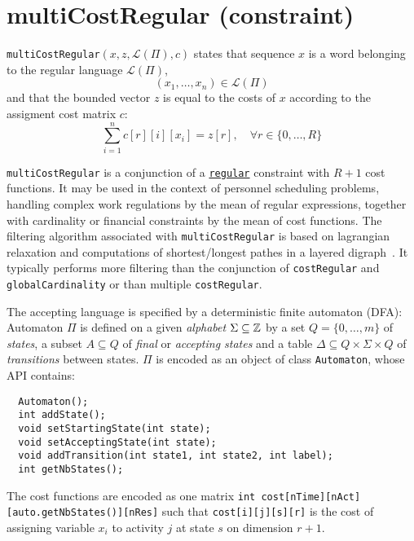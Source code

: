\label{multicostregular}
\hypertarget{multicostregular}{}

\section{multiCostRegular (constraint)}\label{multicostregular:multicostregularconstraint}\hypertarget{multicostregular:multicostregularconstraint}{}
\begin{notedef}
  \texttt{multiCostRegular}$(x,z,\mathcal{L}(\Pi),c)$ states that sequence $x$ is a word belonging to the regular language $\mathcal{L}(\Pi)$,
$$(x_1,\ldots,x_n)\in\mathcal{L}(\Pi)$$
and that the bounded vector $z$ is equal to the costs of $x$ according to the assigment cost matrix $c$:
$$\sum_{i=1}^{n} c[r][i][x_i]=z[r],\quad \forall r\in\{0,\ldots,R\}$$
\end{notedef}
\texttt{multiCostRegular} is a conjunction of a \hyperlink{regular}{\texttt{regular}} constraint with $R+1$ cost functions.
It may be used in the context of personnel scheduling problems, handling complex work regulations by the mean of regular expressions, together with cardinality or financial constraints by the mean of cost functions.
The filtering algorithm associated with \texttt{multiCostRegular} is based on lagrangian relaxation and computations of shortest/longest pathes in a layered digraph~\cite{MenanaCPAIOR09}. It typically performs more filtering than the conjunction of \texttt{costRegular} and \texttt{globalCardinality} or than multiple \texttt{costRegular}.

The accepting language is specified by a deterministic finite automaton (DFA):
Automaton $\Pi$ is defined on a given \emph{alphabet} $\Sigma\subseteq\mathbb{Z}$ by a set $Q=\{0,\ldots,m\}$ of \emph{states}, a subset $A\subseteq Q$ of \emph{final} or \emph{accepting states} and a table $\Delta\subseteq Q\!\times\!\Sigma\!\times Q$ of \emph{transitions} between states. $\Pi$ is encoded as an object of class \texttt{Automaton}, whose API contains:
\begin{lstlisting}
  Automaton();
  int addState();
  void setStartingState(int state); 
  void setAcceptingState(int state); 
  void addTransition(int state1, int state2, int label);
  int getNbStates();
\end{lstlisting}
The cost functions are encoded as one matrix \texttt{int cost[nTime][nAct][auto.getNbStates()][nRes]} such that
\texttt{cost[i][j][s][r]} is the cost of assigning variable $x_i$ to activity $j$ at state $s$ on dimension $r+1$.

